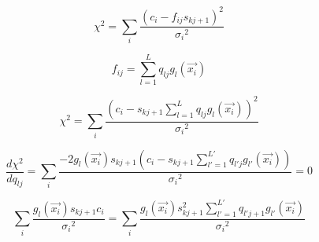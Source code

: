 \documentclass[12pt,a4paper,twoside]{article}
\begin{document}
\begin{equation}
\chi^2 = \sum_{i} \frac{(c_i-f_{ij}s_{kj+1})^2}{{\sigma_i}^2}
\end{equation}

\begin{equation}
f_{ij} = \sum_{l = 1}^L q_{lj} g_l(\vec{x_i})
\end{equation}

\begin{equation}
\chi^2 = \sum_{i} \frac{(c_i- s_{kj+1} \sum_{l = 1}^L q_{lj} g_l(\vec{x_i}))^2}{{\sigma_i}^2}
\end{equation}

\begin{equation}
\frac{d\chi^2}{dq_{lj}} = \sum_{i} \frac{-2 g_l(\vec{x_i}) s_{kj+1} (c_i- s_{kj+1} \sum_{l' = 1}^{L'} q_{l'j} g_{l'}(\vec{x_i}))}{{\sigma_i}^2} = 0
\end{equation}

\begin{equation}
\sum_{i} \frac{g_l(\vec{x_i}) s_{kj+1} c_i}{{\sigma_i}^2} = \sum_{i} \frac{g_l(\vec{x_i}) s_{kj+1}^2 \sum_{l' = 1}^{L'} q_{l'j+1} g_{l'}(\vec{x_i})}{{\sigma_i}^2}
\end{equation}
\end{document}
